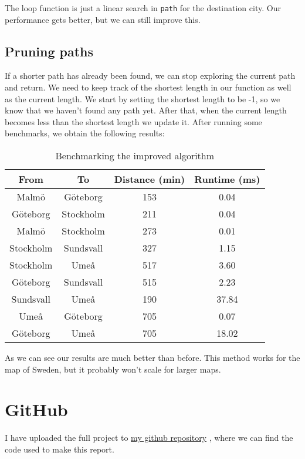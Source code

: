 \documentclass[a4paper,11pt]{article}
\newcommand{\underlinehref}[2]{%
    \href{#1}{\ul{#2}}%
}
\begin{document}
    The loop function is just a linear search in {\tt path} for the destination city.
    Our performance gets better, but we can still improve this.

    \subsection*{Pruning paths}

    If a shorter path has already been found, we can stop exploring the current path and return.
    We need to keep track of the shortest length in our function as well as the current length.
    We start by setting the shortest length to be -1, so we know that we haven't found any path yet.
    After that, when the current length becomes less than the shortest length we update it.
    After running some benchmarks, we obtain the following results:

    \begin{table}[H]
        \begin{center}
            \begin{tabular}{c|c|c|c}
                \textbf{From} & \textbf{To} & \textbf{Distance (min)} & \textbf{Runtime (ms)}\\
                \hline
                Malmö  &   Göteborg     &  153 &     0.04\\
                Göteborg &    Stockholm    &  211 &     0.04\\
                Malmö &    Stockholm    &  273 &     0.01\\
                Stockholm &    Sundsvall    &  327 &     1.15\\
                Stockholm &    Umeå    &  517 &     3.60\\
                Göteborg &    Sundsvall    &  515 &     2.23\\
                Sundsvall &    Umeå    &  190 &     37.84\\
                Umeå &    Göteborg    &  705 &     0.07\\
                Göteborg &    Umeå    &  705 &     18.02\\
            \end{tabular}
            \caption{Benchmarking the improved algorithm}
            \label{tab:table2}
        \end{center}
    \end{table}

    As we can see our results are much better than before.
    This method works for the map of Sweden, but it probably won't scale for larger maps.

    \section*{GitHub}
    I have uploaded the full project to \underlinehref{https://github.com/peterherczku/ID1021/tree/main/assignment-9}{my github repository}, where we can find the code used to make this report.
\end{document}
